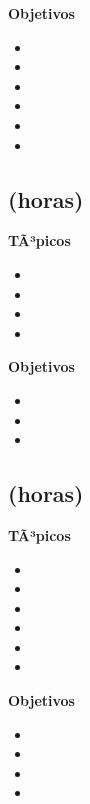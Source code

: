 \textbf{Objetivos}
\begin{itemize}
	\item \ARCINCOObjUNO
	\item \ARCINCOObjDOS
	\item \ARCINCOObjTRES
	\item \ARCINCOObjCUATRO
	\item \ARCINCOObjCINCO
	\item \ARCINCOObjSEIS
\end{itemize}

\subsection{\ARSEISDef  (\ARSEISHours horas)}\label{sec:BOK-AR6}

\textbf{TÃ³picos}
\begin{itemize}
	\item \ARSEISTopicImplementacion
	\item \ARSEISTopicUnidad
	\item \ARSEISTopicInstruccion
	\item \ARSEISTopicIntroduccion
\end{itemize}

\textbf{Objetivos}
\begin{itemize}
	\item \ARSEISObjUNO
	\item \ARSEISObjDOS
	\item \ARSEISObjTRES
\end{itemize}

\subsection{\ARSIETEDef  (\ARSIETEHours horas)}\label{sec:BOK-AR7}

\textbf{TÃ³picos}
\begin{itemize}
	\item \ARSIETETopicIntroduccion
	\item \ARSIETETopicArquitectura
	\item \ARSIETETopicInterconeccion
	\item \ARSIETETopicSistemas
	\item \ARSIETETopicCoherencia
	\item \ARSIETETopicModelos
\end{itemize}

\textbf{Objetivos}
\begin{itemize}
	\item \ARSIETEObjUNO
	\item \ARSIETEObjDOS
	\item \ARSIETEObjTRES
	\item \ARSIETEObjCUATRO
\end{itemize}

